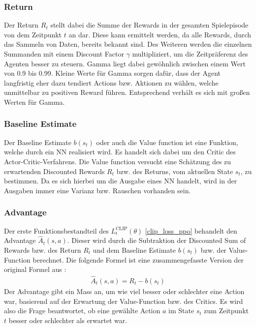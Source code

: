 \subsubsection{Return} \label{sec:Return}
Der Return $R_{t}$ stellt dabei die Summe der Rewards in der gesamten Spielepisode von dem Zeitpunkt $t$ an dar. Diese kann ermittelt werden, da alle Rewards, durch das Sammeln von Daten, bereits bekannt sind. Des Weiteren werden die einzelnen Summanden mit einem Discount Factor $\gamma$ multipliziert, um die Zeitpräferenz des Agenten besser zu steuern. Gamma liegt dabei gewöhnlich zwischen einem Wert von 0.9 bis 0.99. Kleine Werte für Gamma sorgen dafür, dass der Agent langfristig eher dazu tendiert Actions bzw. Aktionen zu wählen, welche unmittelbar zu positiven Reward führen. Entsprechend verhält es sich mit großen Werten für Gamma. \cite[S. 42 ff.]{Sutton1998}

\subsubsection{Baseline Estimate} \label{sec:Baseline_Estimate}
Der Baseline Estimate $b(s_{t})$ oder auch die Value function ist eine Funktion, welche durch ein NN realisiert wird. Es handelt sich dabei um den Critic des Actor-Critic-Verfahrens. Die Value function versucht eine Schätzung des zu erwartenden Discounted Rewards $R_{t}$ bzw. des Returns, vom aktuellen State $s_{t}$, zu bestimmen. Da es sich hierbei um die Ausgabe eines NN handelt, wird in der Ausgaben immer eine Varianz bzw. Rauschen vorhanden sein. \cite[Kapitel 3]{asynchronous_methods_for_deep_rl}

\subsubsection{Advantage} \label{sec:Advantages}
Der erste Funktionsbestandteil des $L^\text{CLIP}_{t} (\theta)$ \ref{clip_loss_ppo} behandelt den Advantage $\hat{A}_{t}(s, a)$. Dieser wird durch die Subtraktion der Discounted Sum of Rewards bzw. des Return $R_{t}$ und dem Baseline Estimate $b(s_{t})$ bzw. der Value-Function berechnet. Die folgende Formel ist eine zusammengefasste Version der original Formel aus \cite{PPO}:
\begin{align}
	\hat{A}_{t}(s, a) = R_{t} - b(s_{t})
\end{align}
Der Advantage gibt ein Mass an, um wie viel besser oder schlechter eine Action war, basierend auf der Erwartung der Value-Function bzw. des Critics. Es wird also die Frage beantwortet, ob eine gewählte Action $a$ im State $s_{t}$ zum Zeitpunkt $t$ besser oder schlechter als erwartet war. \cite[Kapitel 3]{asynchronous_methods_for_deep_rl}


